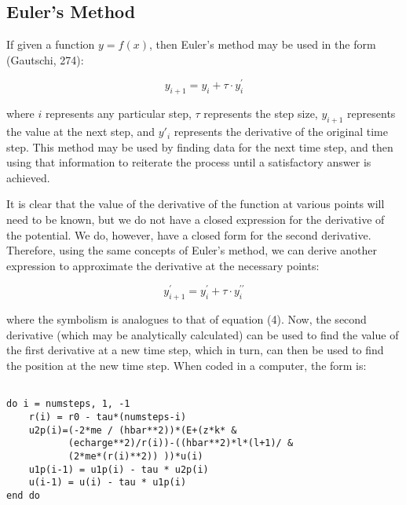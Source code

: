 \documentclass{article}
\begin{document}
\begin{multicols}{2}
\subsection{Euler's Method}
If given a function $y = f(x)$, then Euler's method may be used in the form (Gautschi, 274):

\begin{equation}
\label{equation4}
y_{i+1} = y_i + \tau \cdot y^{\prime}_i 
\end{equation}

\vspace{0.1in}

where $i$ represents any particular step, $\tau$ represents the step size, $y_{i+1}$ represents the value at the next step, and $y'_i$ represents the derivative of the original time step. This method may be used by finding data for the next time step, and then using that information to reiterate the process until a satisfactory answer is achieved.

It is clear that the value of the derivative of the function at various points will need to be known, but we do not have a closed expression for the derivative of the potential. We do, however, have a closed form for the second derivative. Therefore, using the same concepts of Euler's method, we can derive another expression to approximate the derivative at the necessary points:

\begin{equation}
\label{equation5}
y^{\prime}_{i+1} = y^{\prime}_i + \tau \cdot y^{\prime\prime}_i
\end{equation}

\vspace{0.1in}

where the symbolism is analogues to that of equation (4). Now, the second derivative (which may be analytically calculated) can be used to find the value of the first derivative at a new time step, which in turn, can then be used to find the position at the new time step. When coded in a computer, the form is:

\small{
\begin{verbatim}

do i = numsteps, 1, -1
    r(i) = r0 - tau*(numsteps-i)
    u2p(i)=(-2*me / (hbar**2))*(E+(z*k* &
           (echarge**2)/r(i))-((hbar**2)*l*(l+1)/ &
           (2*me*(r(i)**2)) ))*u(i)
    u1p(i-1) = u1p(i) - tau * u2p(i)
    u(i-1) = u(i) - tau * u1p(i)
end do
    
\end{verbatim}
}


\end{multicols}
\end{document}
